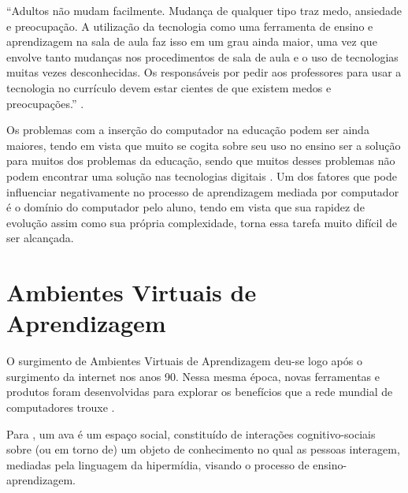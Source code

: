 \begin{citacao}
``Adultos não mudam facilmente. Mudança de qualquer tipo traz medo, ansiedade e preocupação. A utilização da tecnologia como uma ferramenta de ensino e aprendizagem na sala de aula faz isso em um grau ainda maior, uma vez que envolve tanto mudanças nos procedimentos de sala de aula e o uso de tecnologias muitas vezes desconhecidas. Os responsáveis por pedir aos professores para usar a tecnologia no currículo devem estar cientes de que existem medos e preocupações.'' \cite[p.~96, Tradução Livre]{bitner2002integrating}.
\end{citacao}

Os problemas com a inserção do computador na educação podem ser ainda maiores, tendo em vista que muito se cogita sobre seu uso no ensino ser a solução para muitos dos problemas da educação, sendo que muitos desses problemas não podem encontrar uma solução nas tecnologias digitais \cite{silva2009ambiente}. Um dos fatores que pode influenciar negativamente no processo de aprendizagem mediada por computador é o domínio do computador pelo aluno, tendo em vista que sua rapidez de evolução assim como sua própria complexidade, torna essa tarefa muito difícil de ser alcançada.

\section{Ambientes Virtuais de Aprendizagem}

O surgimento de Ambientes Virtuais de Aprendizagem deu-se logo após o surgimento da internet nos anos 90. Nessa mesma época, novas ferramentas e produtos foram desenvolvidas para explorar os benefícios que a rede mundial de computadores trouxe \cite{oleary2002virtual}.

Para , um \gls{ava} é um espaço social, constituído de interações cognitivo-sociais sobre (ou em torno de) um objeto de conhecimento no qual as pessoas interagem, mediadas pela linguagem da hipermídia, visando o processo de ensino-aprendizagem.

